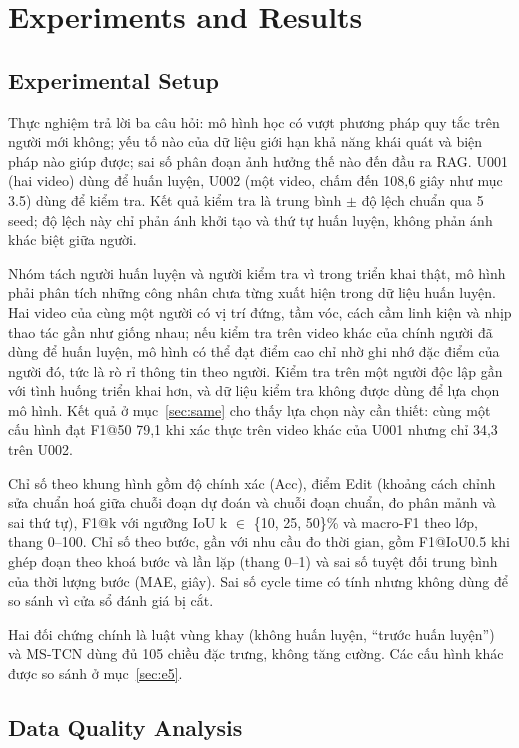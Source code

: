 \section{Experiments and Results}

\subsection{Experimental Setup}\label{sec:e1}

Thực nghiệm trả lời ba câu hỏi: mô hình học có vượt phương pháp quy tắc trên người mới không; yếu tố nào của dữ liệu giới hạn khả năng khái quát và biện pháp nào giúp được; sai số phân đoạn ảnh hưởng thế nào đến đầu ra RAG. U001 (hai video) dùng để huấn luyện, U002 (một video, chấm đến 108,6 giây như mục 3.5) dùng để kiểm tra. Kết quả kiểm tra là trung bình $\pm$ độ lệch chuẩn qua 5 seed; độ lệch này chỉ phản ánh khởi tạo và thứ tự huấn luyện, không phản ánh khác biệt giữa người.

Nhóm tách người huấn luyện và người kiểm tra vì trong triển khai thật, mô hình phải phân tích những công nhân chưa từng xuất hiện trong dữ liệu huấn luyện. Hai video của cùng một người có vị trí đứng, tầm vóc, cách cầm linh kiện và nhịp thao tác gần như giống nhau; nếu kiểm tra trên video khác của chính người đã dùng để huấn luyện, mô hình có thể đạt điểm cao chỉ nhờ ghi nhớ đặc điểm của người đó, tức là rò rỉ thông tin theo người. Kiểm tra trên một người độc lập gần với tình huống triển khai hơn, và dữ liệu kiểm tra không được dùng để lựa chọn mô hình. Kết quả ở mục~\ref{sec:same} cho thấy lựa chọn này cần thiết: cùng một cấu hình đạt F1@50 79,1 khi xác thực trên video khác của U001 nhưng chỉ 34,3 trên U002.

Chỉ số theo khung hình gồm độ chính xác (Acc), điểm Edit (khoảng cách chỉnh sửa chuẩn hoá giữa chuỗi đoạn dự đoán và chuỗi đoạn chuẩn, đo phân mảnh và sai thứ tự), F1@k với ngưỡng IoU k $\in$ \{10, 25, 50\}\% và macro-F1 theo lớp, thang 0–100. Chỉ số theo bước, gần với nhu cầu đo thời gian, gồm F1@IoU0.5 khi ghép đoạn theo khoá bước và lần lặp (thang 0–1) và sai số tuyệt đối trung bình của thời lượng bước (MAE, giây). Sai số cycle time có tính nhưng không dùng để so sánh vì cửa sổ đánh giá bị cắt.

Hai đối chứng chính là luật vùng khay (không huấn luyện, “trước huấn luyện”) và MS-TCN dùng đủ 105 chiều đặc trưng, không tăng cường. Các cấu hình khác được so sánh ở mục~\ref{sec:e5}.

\subsection{Data Quality Analysis}\label{sec:e2}

